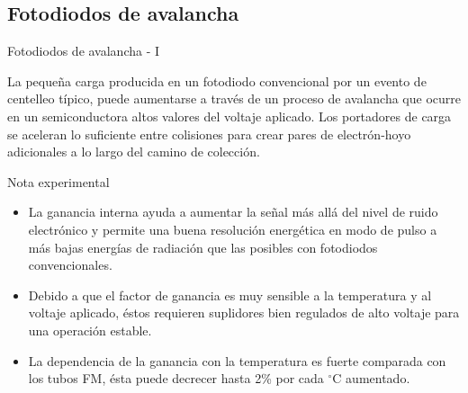\documentclass[a4paper,10pt]{beamer}
\begin{document}
\subsection{Fotodiodos de avalancha}
\begin{frame}{Fotodiodos de avalancha - I}
 \begin{justify}
 La pequeña carga producida en un fotodiodo convencional por un evento de centelleo 
 típico, puede aumentarse a través de un proceso de avalancha que ocurre en un 
 semiconductora altos valores del voltaje aplicado. Los portadores de carga se 
 aceleran lo suficiente entre colisiones para crear pares de electrón-hoyo adicionales 
 a lo largo del camino de colección. 
 \end{justify}
 
 \begin{exampleblock}{Nota experimental}
  \begin{itemize}
   \item \begin{justify}
          La ganancia interna ayuda a aumentar la señal más allá del nivel de 
          ruido electrónico y permite una buena resolución energética en modo 
          de pulso a más bajas energías de radiación que las posibles con 
          fotodiodos convencionales.
         \end{justify}
    \item \begin{justify}
         Debido a que el factor de ganancia es muy sensible a la temperatura y 
         al voltaje aplicado, éstos requieren suplidores bien regulados de 
         alto voltaje para una operación estable.
         \end{justify}
     \item \begin{justify}
         La dependencia de la ganancia con la temperatura es fuerte comparada con 
         los tubos FM, ésta puede decrecer hasta 2\% por cada $^\circ$C aumentado.
         \end{justify}
  \end{itemize}

 \end{exampleblock}
 
\end{frame}
\end{document}

